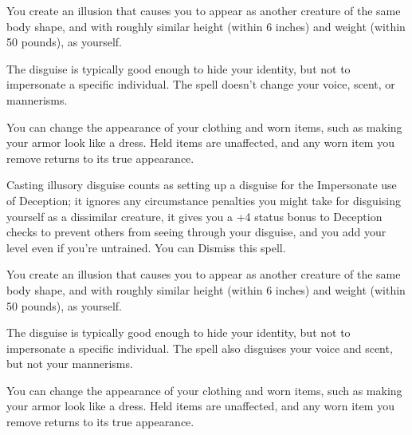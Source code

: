 



\bgroup
\engschrift\small

You create an illusion that causes you to appear as another creature of the same body shape,
and with roughly similar height (within 6 inches) and weight (within 50 pounds), as yourself.

The disguise is typically good enough to hide your identity, but not to impersonate a specific individual.
The spell doesn't change your voice, scent, or mannerisms.

You can change the appearance of your clothing and worn items, such as making your armor look like a dress.
Held items are unaffected, and any worn item you remove returns to its true appearance.

Casting illusory disguise counts as setting up a disguise for the Impersonate use of Deception;
it ignores any circumstance penalties you might take for disguising yourself as a dissimilar creature,
it gives you a +4 status bonus to Deception checks to prevent others from seeing through your disguise,
and you add your level even if you're untrained.
You can Dismiss this spell.

\egroup





\bgroup
\engschrift\small

You create an illusion that causes you to appear as another creature of the same body shape,
and with roughly similar height (within 6 inches) and weight (within 50 pounds), as yourself.

The disguise is typically good enough to hide your identity, but not to impersonate a specific individual.
The spell also disguises your voice and scent, but not your mannerisms.

You can change the appearance of your clothing and worn items, such as making your armor look like a dress.
Held items are unaffected, and any worn item you remove returns to its true appearance.

